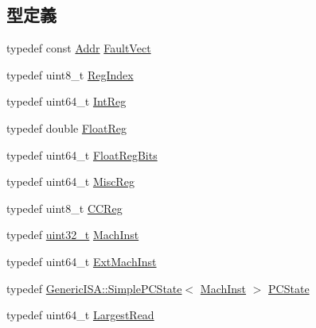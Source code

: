 \subsection*{型定義}
\begin{DoxyCompactItemize}
\item 
typedef const \hyperlink{classm5_1_1params_1_1Addr}{Addr} \hyperlink{namespaceAlphaISA_a5c26c9764cc05486454998efadf79833}{FaultVect}
\item 
typedef uint8\_\-t \hyperlink{namespaceAlphaISA_a1c4e98d2e6a11a837bf9ccd20dd32f8a}{RegIndex}
\item 
typedef uint64\_\-t \hyperlink{namespaceAlphaISA_a0e080577527fb3e9685399f75b5caf15}{IntReg}
\item 
typedef double \hyperlink{namespaceAlphaISA_a06fae4f187c7c94b8b0046dd6802be48}{FloatReg}
\item 
typedef uint64\_\-t \hyperlink{namespaceAlphaISA_a6905e424d12491fe126e1a22a9c8d655}{FloatRegBits}
\item 
typedef uint64\_\-t \hyperlink{namespaceAlphaISA_aa16539aa6584fd12f7d6fa868f75b4de}{MiscReg}
\item 
typedef uint8\_\-t \hyperlink{namespaceAlphaISA_a5834599c0196ce4accda8049e7320621}{CCReg}
\item 
typedef \hyperlink{Type_8hh_a435d1572bf3f880d55459d9805097f62}{uint32\_\-t} \hyperlink{namespaceAlphaISA_a301c22ea09fa33dcfe6ddf22f203699c}{MachInst}
\item 
typedef uint64\_\-t \hyperlink{namespaceAlphaISA_aec686c38e40c7f794f1435591c15c275}{ExtMachInst}
\item 
typedef \hyperlink{classGenericISA_1_1SimplePCState}{GenericISA::SimplePCState}$<$ \hyperlink{namespaceAlphaISA_a301c22ea09fa33dcfe6ddf22f203699c}{MachInst} $>$ \hyperlink{namespaceAlphaISA_af780de49982ecf691215cac9b9dfc615}{PCState}
\item 
typedef uint64\_\-t \hyperlink{namespaceAlphaISA_a13e8c318dd29afdaf79751a072344db8}{LargestRead}
\end{DoxyCompactItemize}
